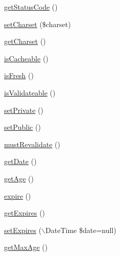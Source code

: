 \begin{DoxyCompactItemize}
\item 
\hyperlink{class_symfony_1_1_component_1_1_http_foundation_1_1_response_a094778dd1c04fe44626000b47ea0c0bb}{get\-Status\-Code} ()
\item 
\hyperlink{class_symfony_1_1_component_1_1_http_foundation_1_1_response_a81ee11b0f5fadecaece55170fea54b29}{set\-Charset} (\$charset)
\item 
\hyperlink{class_symfony_1_1_component_1_1_http_foundation_1_1_response_abca2d528da8311b6fcfe040768cbaa24}{get\-Charset} ()
\item 
\hyperlink{class_symfony_1_1_component_1_1_http_foundation_1_1_response_a8dc10087cfbf077529664dd5a920b7c7}{is\-Cacheable} ()
\item 
\hyperlink{class_symfony_1_1_component_1_1_http_foundation_1_1_response_aec921842951c4e0f2108e3def115d0c4}{is\-Fresh} ()
\item 
\hyperlink{class_symfony_1_1_component_1_1_http_foundation_1_1_response_a7f1b19c9f61c89f55223cfe8b8df25c4}{is\-Validateable} ()
\item 
\hyperlink{class_symfony_1_1_component_1_1_http_foundation_1_1_response_adb29eaacab5a8049ce8df4d49924c8ca}{set\-Private} ()
\item 
\hyperlink{class_symfony_1_1_component_1_1_http_foundation_1_1_response_a15a91c86f189c03099b09ca080b6c008}{set\-Public} ()
\item 
\hyperlink{class_symfony_1_1_component_1_1_http_foundation_1_1_response_a749a7c517410aa034adb39200e5f241b}{must\-Revalidate} ()
\item 
\hyperlink{class_symfony_1_1_component_1_1_http_foundation_1_1_response_a24d89b0ad05ea2e33626b1fc8ed59bc3}{get\-Date} ()
\item 
\hyperlink{class_symfony_1_1_component_1_1_http_foundation_1_1_response_aa45b65846565bea3073f766710582a3f}{get\-Age} ()
\item 
\hyperlink{class_symfony_1_1_component_1_1_http_foundation_1_1_response_a9391ae5e11c880cb0320c9e44dcb99d0}{expire} ()
\item 
\hyperlink{class_symfony_1_1_component_1_1_http_foundation_1_1_response_ae49c82f460cbe6981fe680be668d0b1c}{get\-Expires} ()
\item 
\hyperlink{class_symfony_1_1_component_1_1_http_foundation_1_1_response_a96c1f8a860ed584cca52e1b9da5c10db}{set\-Expires} ($\backslash$\-Date\-Time \$date=null)
\item 
\hyperlink{class_symfony_1_1_component_1_1_http_foundation_1_1_response_a560b674cd481fd98d23b84e2756948bd}{get\-Max\-Age} ()

\end{DoxyCompactItemize}
